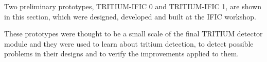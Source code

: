 Two preliminary prototypes, TRITIUM-IFIC 0 and TRITIUM-IFIC 1, are shown in this section, which were designed, developed and built at the IFIC workshop.

These prototypes were thought to be a small scale of the final TRITIUM detector module and they were used to learn about tritium detection, to detect possible problems in their designs and to verify the improvements applied to them.